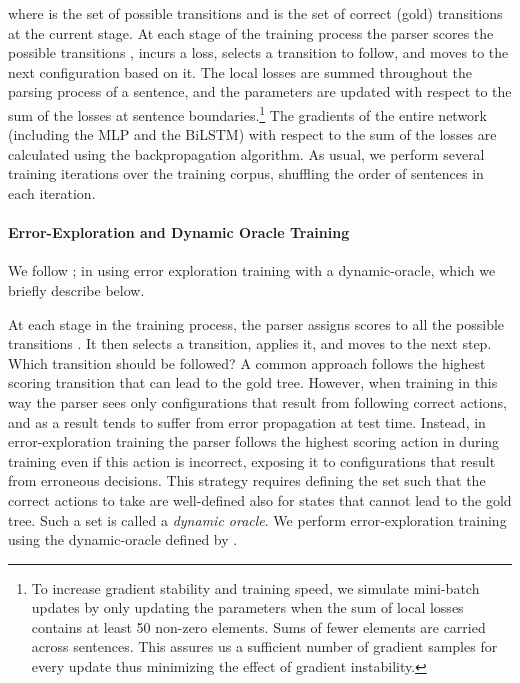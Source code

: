 \documentclass[11pt]{article}
\begin{document}
\noindent where  is the set of possible transitions and  is the set of
correct (gold) transitions at the current stage. 
At each stage of the training process the parser scores the possible transitions
, incurs a loss, selects a transition to follow, and moves to the next
configuration based on it.
The local losses are summed throughout the parsing
process of a sentence, and the parameters are updated with respect to the sum of the losses at
sentence boundaries.\footnote{To increase gradient stability and training speed,
we simulate mini-batch updates by only updating the parameters when the sum of local losses contains
at least 50 non-zero elements.  Sums of fewer elements are carried across
sentences.  This assures us a sufficient number of gradient samples for every update thus minimizing the effect of
gradient instability.}
The gradients of the entire network (including the MLP and the BiLSTM) with respect to the sum of the losses are
calculated using the backpropagation algorithm.
As usual, we perform several training iterations over the training corpus,
shuffling the order of sentences in each iteration.

\paragraph{Error-Exploration and Dynamic Oracle Training}
We follow ; in
using error exploration training with a dynamic-oracle, which we briefly
describe below.

At each stage in the training process, the parser assigns scores to all the
possible transitions . It then selects a transition, applies it, and moves to the
next step. 
Which transition should be followed?  A common approach follows the highest
scoring transition that can lead to the gold tree. However, when training in
this way the parser sees only configurations that result from following correct
actions, and as a result tends to suffer from error propagation at test time.
Instead, in error-exploration training the parser follows the highest scoring
action in  during training even if this action is incorrect, exposing it to
configurations that result from erroneous decisions.
This strategy requires defining the set  such that the correct actions to
take are well-defined also for states that cannot lead to the gold tree.
Such a set  is called a \emph{dynamic oracle}. We perform error-exploration
training using the dynamic-oracle defined by .
\end{document}
